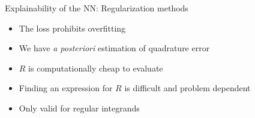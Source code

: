 \begin{frame}{Explainability of the NN: Regularization methods}
\vspace{0.25cm}
\begin{itemize}
\item[\tickYes]The loss prohibits overfitting
\vspace{0.15cm}

\item[\tickYes] We have {\it a posteriori} estimation of quadrature error
\vspace{0.15cm}

\item[\tickYes] $R$ is computationally cheap to evaluate
\vspace{0.15cm}
%

\item[\tickNo] Finding an expression for $R$ is difficult and problem dependent
\vspace{0.15cm}

\item[\tickNo] Only valid for regular integrands
\end{itemize}
\end{frame}



